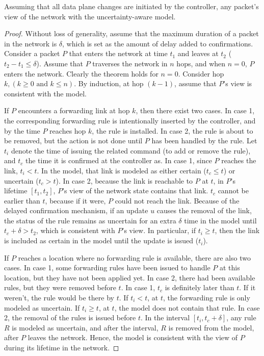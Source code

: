   \vspace{-0.1in}
\begin{theorem} Assuming that all data plane changes are initiated by the controller,
any packet's view of the network  with the uncertainty-aware model.
\end{theorem}
  \vspace{-0.1in}
  \vspace{-0.1in}
\begin{proof} Without loss of generality, assume that the maximum duration of a
packet in the network is $\delta$, which is set as the amount of delay added to
confirmations.  Consider a packet $P$ that enters the network at time $t_1$ and
leaves at $t_2$ ($t_2-t_1 \le \delta$).  Assume that $P$ traverses the network in
$n$ hops, and when $n=0$, $P$ enters the network.  Clearly the theorem holds for
$n=0$.  Consider hop $k, (k \ge 0\mbox{ and } k \le n)$.  By induction, at
hop $(k-1)$, assume that $P$'s view is consistent with the model.

If $P$ encounters a forwarding link at hop $k$, then there exist two cases.
In case 1, the corresponding forwarding rule is intentionally inserted by the
controller, and by the time $P$ reaches hop $k$, the rule is installed.  In case
2, the rule is about to be removed, but the action is not done until $P$ has been
handled by the rule.  Let $t_i$ denote the time of issuing the related command (to add or
remove the rule), and $t_c$ the time it is confirmed at the controller as.  
In case 1, since $P$ reaches the link, $t_i < t$.  In the model, that
link is modeled as either certain ($t_c \le t$) or uncertain ($t_c > t$).  In
case 2, because the link is reachable to $P$ at $t$, in $P$'s lifetime $[t_1,
t_2]$, $P$'s view of the network state contains that link.  $t_c$ cannot be
earlier than $t$, because if it were, $P$ could not reach the link.  Because of the delayed
confirmation mechanism, if an update $u$ causes the removal of the link, the
status of the rule remains as uncertain for an extra $\delta$ time in the model
until $t_c + \delta > t_2$, which is consistent with $P$'s view.  
In particular, if $t_i \ge t$, then the link is included as certain in the model
until the update is issued ($t_i$).

If $P$ reaches a location where no forwarding rule is available, there are also
two cases.  In case 1, some forwarding rules have been issued to handle $P$ at this
location, but they have not been applied yet. In case 2, there had been available rules, but
they were removed before $t$.  In case 1, $t_c$ is definitely later than $t$.
If it weren't, the rule would be there by $t$.  If $t_i < t$, at $t$, the forwarding rule
is only modeled as uncertain.  If $t_i \ge t$, at $t$, the model does not
contain that rule.  In case 2, the removal of the rules is issued before $t$.
In the interval $[t_i, t_c + \delta]$, any rule $R$ is modeled as uncertain,
and after the interval, $R$ is removed from the model, after $P$ leaves the
network.  Hence, the model is consistent with the view of $P$ during its
lifetime in the network.
\end{proof}
